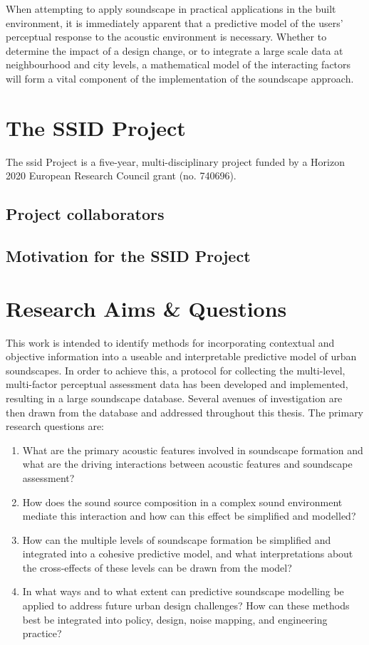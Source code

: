 When attempting to apply soundscape in practical applications in the built environment, it is immediately apparent that a predictive model of the users' perceptual response to the acoustic environment is necessary. Whether to determine the impact of a design change, or to integrate a large scale data at neighbourhood and city levels, a mathematical model of the interacting factors will form a vital component of the implementation of the soundscape approach. 

\section{The SSID Project}
The \gls{ssid} Project is a five-year, multi-disciplinary project funded by a Horizon 2020 European Research Council grant (no. 740696).

\subsection{Project collaborators}

\subsection{Motivation for the SSID Project}

\section{Research Aims \& Questions}
This work is intended to identify methods for incorporating contextual and objective information into a useable and interpretable predictive model of urban soundscapes. In order to achieve this, a protocol for collecting the multi-level, multi-factor perceptual assessment data has been developed and implemented, resulting in a large soundscape database. Several avenues of investigation are then drawn from the database and addressed throughout this thesis. The primary research questions are:

\begin{enumerate}
  \item What are the primary acoustic features involved in soundscape formation and what are the driving interactions between acoustic features and soundscape assessment?
  \item How does the sound source composition in a complex sound environment mediate this interaction and how can this effect be simplified and modelled?
  \item How can the multiple levels of soundscape formation be simplified and integrated into a cohesive predictive model, and what interpretations about the cross-effects of these levels can be drawn from the model?
  \item In what ways and to what extent can predictive soundscape modelling be applied to address future urban design challenges? How can these methods best be integrated into policy, design, noise mapping, and engineering practice?
\end{enumerate}


